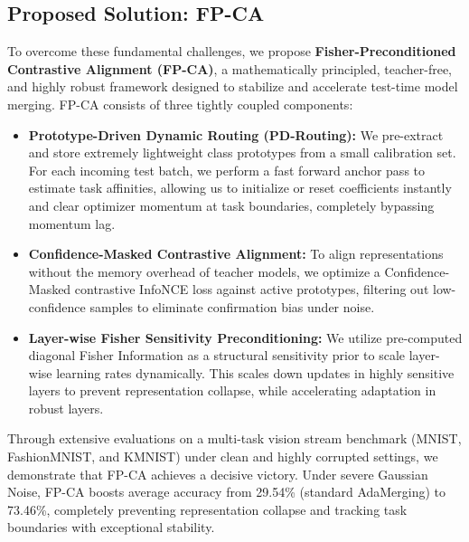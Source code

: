 \documentclass{article}
\theoremstyle{plain}
\theoremstyle{definition}
\theoremstyle{remark}
\begin{document}
\subsection{Proposed Solution: FP-CA}
To overcome these fundamental challenges, we propose \textbf{Fisher-Preconditioned Contrastive Alignment (FP-CA)}, a mathematically principled, teacher-free, and highly robust framework designed to stabilize and accelerate test-time model merging. FP-CA consists of three tightly coupled components:
\begin{itemize}
  \item \textbf{Prototype-Driven Dynamic Routing (PD-Routing):} We pre-extract and store extremely lightweight class prototypes from a small calibration set. For each incoming test batch, we perform a fast forward anchor pass to estimate task affinities, allowing us to initialize or reset coefficients instantly and clear optimizer momentum at task boundaries, completely bypassing momentum lag.
  \item \textbf{Confidence-Masked Contrastive Alignment:} To align representations without the memory overhead of teacher models, we optimize a Confidence-Masked contrastive InfoNCE loss against active prototypes, filtering out low-confidence samples to eliminate confirmation bias under noise.
  \item \textbf{Layer-wise Fisher Sensitivity Preconditioning:} We utilize pre-computed diagonal Fisher Information as a structural sensitivity prior to scale layer-wise learning rates dynamically. This scales down updates in highly sensitive layers to prevent representation collapse, while accelerating adaptation in robust layers.
\end{itemize}

Through extensive evaluations on a multi-task vision stream benchmark (MNIST, FashionMNIST, and KMNIST) under clean and highly corrupted settings, we demonstrate that FP-CA achieves a decisive victory. Under severe Gaussian Noise, FP-CA boosts average accuracy from 29.54\% (standard AdaMerging) to 73.46\%, completely preventing representation collapse and tracking task boundaries with exceptional stability.
\end{document}
